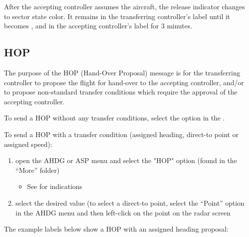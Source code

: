 \documentclass[a4paper,oneside,11pt]{memoir}
\begin{document}
\bigskip

After the accepting controller assumes the aircraft, the release indicator changes to sector state color. It remains in the transferring controller’s label until it becomes , and in the accepting controller’s label for 3 minutes.


\subsection{HOP}
\label{coo:hop}
The purpose of the HOP (Hand-Over Proposal) message is for the transferring controller to propose the flight for hand-over to the accepting controller, and/or to propose non-standard transfer conditions which require the approval of the accepting controller.

\bigskip

To send a HOP without any transfer conditions, select the  option in the .

\bigskip

To send a HOP with a transfer condition (assigned heading, direct-to point or assigned speed):

\begin{enumerate}
  \item open the AHDG or ASP menu and select the "HOP" option (found in the “More” folder)
  \begin{itemize}
    \item See  for indications
  \end{itemize}
  \item select the desired value (to select a direct-to point, select the “Point” option in the AHDG menu and then left-click on the point on the radar screen
\end{enumerate}

The example labels below show a HOP with an assigned heading proposal:
\end{document}

